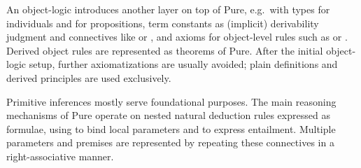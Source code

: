 \begin{isabellebody}
\begin{isamarkuptext}
  \medskip An object-logic introduces another layer on top of Pure,
  e.g.\ with types  for individuals and  for
  propositions, term constants  as
  (implicit) derivability judgment and connectives like  or , and axioms for object-level
  rules such as  or .  Derived object rules are represented as theorems of
  Pure.  After the initial object-logic setup, further axiomatizations
  are usually avoided; plain definitions and derived principles are
  used exclusively.%
\end{isamarkuptext}%
\isamarkuptrue%
%
\isamarkuptrue%
%
\begin{isamarkuptext}%
Primitive inferences mostly serve foundational purposes.  The main
  reasoning mechanisms of Pure operate on nested natural deduction
  rules expressed as formulae, using  to bind local
  parameters and  to express entailment.  Multiple
  parameters and premises are represented by repeating these
  connectives in a right-associative manner.


\end{isamarkuptext}
\end{isabellebody}
